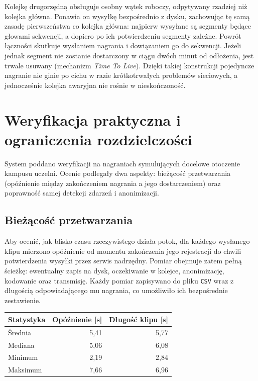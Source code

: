 Kolejkę drugorzędną obsługuje osobny wątek roboczy, odpytywany rzadziej niż kolejka główna. Ponawia on wysyłkę bezpośrednio z dysku, zachowując tę samą zasadę pierwszeństwa co kolejka główna: najpierw wysyłane są segmenty będące głowami sekwencji, a dopiero po ich potwierdzeniu segmenty zależne. Powrót łączności skutkuje wysłaniem nagrania i dowiązaniem go do sekwencji. Jeżeli jednak segment nie zostanie dostarczony w ciągu dwóch minut od odłożenia, jest trwale usuwany (mechanizm \textit{Time To Live}). Dzięki takiej konstrukcji pojedyncze nagranie nie ginie po cichu w razie krótkotrwałych problemów sieciowych, a jednocześnie kolejka awaryjna nie rośnie w nieskończoność.

\section{Weryfikacja praktyczna i ograniczenia rozdzielczości}\label{sec:detektor_wyniki}

System poddano weryfikacji na nagraniach symulujących docelowe otoczenie kampusu uczelni. Ocenie podlegały dwa aspekty: bieżącość przetwarzania (opóźnienie między zakończeniem nagrania a jego dostarczeniem) oraz poprawność samej detekcji zdarzeń i anonimizacji.

\subsection{Bieżącość przetwarzania}
Aby ocenić, jak blisko czasu rzeczywistego działa potok, dla każdego wysłanego klipu mierzono opóźnienie od momentu zakończenia jego rejestracji do chwili potwierdzenia wysyłki przez serwis nadrzędny. Pomiar obejmuje zatem pełną ścieżkę: ewentualny zapis na dysk, oczekiwanie w kolejce, anonimizację, kodowanie oraz transmisję. Każdy pomiar zapisywano do pliku \texttt{CSV} wraz z długością odpowiadającego mu nagrania, co umożliwiło ich bezpośrednie zestawienie.

\begin{table-}
    \centering
    \small
    \begin{tabular}{lrr}
        \toprule
        \textbf{Statystyka} & \textbf{Opóźnienie [s]} & \textbf{Długość klipu [s]} \\
        \midrule
        Średnia   & 5,41 & 5,77 \\
        Mediana   & 5,06 & 6,08 \\
        Minimum   & 2,19 & 2,84 \\
        Maksimum  & 7,66 & 6,96 \\
        \bottomrule
    \end{tabular}
    \caption{Czas od zakończenia nagrywania klipu do potwierdzenia jego wysłania, zestawiony z długością nagrania (próba 26 klipów, maszyna domowa).}\label{tab:detektor_latency}
\end{table-}


